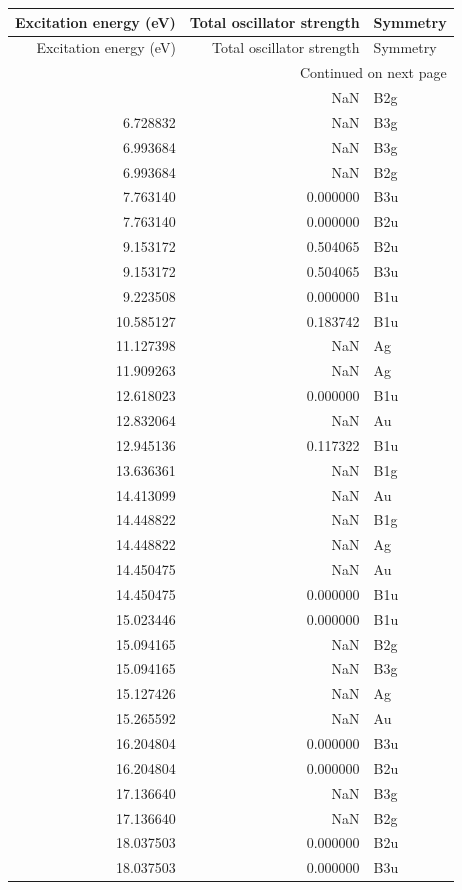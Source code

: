 \begin{longtable}{rrl}
\toprule
Excitation energy (eV) & Total oscillator strength & Symmetry \\
\midrule
\endfirsthead
\toprule
Excitation energy (eV) & Total oscillator strength & Symmetry \\
\midrule
\endhead
\midrule
\multicolumn{3}{r}{Continued on next page} \\
\midrule
\endfoot
\bottomrule
\endlastfoot
6.728832 & NaN & B2g \\
6.728832 & NaN & B3g \\
6.993684 & NaN & B3g \\
6.993684 & NaN & B2g \\
7.763140 & 0.000000 & B3u \\
7.763140 & 0.000000 & B2u \\
9.153172 & 0.504065 & B2u \\
9.153172 & 0.504065 & B3u \\
9.223508 & 0.000000 & B1u \\
10.585127 & 0.183742 & B1u \\
11.127398 & NaN & Ag \\
11.909263 & NaN & Ag \\
12.618023 & 0.000000 & B1u \\
12.832064 & NaN & Au \\
12.945136 & 0.117322 & B1u \\
13.636361 & NaN & B1g \\
14.413099 & NaN & Au \\
14.448822 & NaN & B1g \\
14.448822 & NaN & Ag \\
14.450475 & NaN & Au \\
14.450475 & 0.000000 & B1u \\
15.023446 & 0.000000 & B1u \\
15.094165 & NaN & B2g \\
15.094165 & NaN & B3g \\
15.127426 & NaN & Ag \\
15.265592 & NaN & Au \\
16.204804 & 0.000000 & B3u \\
16.204804 & 0.000000 & B2u \\
17.136640 & NaN & B3g \\
17.136640 & NaN & B2g \\
18.037503 & 0.000000 & B2u \\
18.037503 & 0.000000 & B3u \\

\end{longtable}
